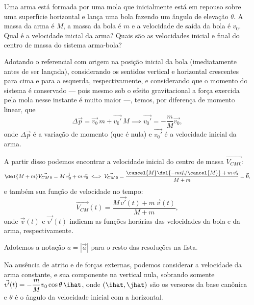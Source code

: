 \documentclass[]{IMTexam}
\author{Isabella B.}
\date{}
\begin{document}
\maketitle

\begin{questions}

	\question Uma arma está formada por uma mola que inicialmente está em repouso sobre uma superfície horizontal e lança uma bola fazendo um ângulo de elevação $ \theta $. A massa da arma é $ M $, a massa da bola é $ m $ e a velocidade de saída da bola é $ v_0 $. Qual é a velocidade inicial da arma? Quais são as velocidades inicial e final do centro de massa do sistema arma-bola?

	\begin{solution}
		Adotando o referencial com origem na posição inicial da bola (imediatamente antes de ser lançada), considerando os sentidos vertical e horizontal crescentes para cima e para a esquerda, respectivamente, e considerando que o momento do sistema é conservado --- pois mesmo sob o efeito gravitacional a força exercida pela mola nesse instante é muito maior ---, temos, por diferença de momento linear, que
		\[ \Delta \vec{p} = \vec{v_0}\,m + \vec{v_0'}\,M\implies \vec{v_0'}=-\dfrac{m}{M}\vec{v_0}, \]
		onde $ \Delta\vec{p} $ é a variação de momento (que é nula) e $ \vec{v_0'} $ é a velocidade inicial da arma.
		
		A partir disso podemos encontrar a velocidade inicial do centro de massa $ \vec{V_{CM\,0}} $:
		\[ \del{M+m}\vec{V_{CM\,0}}=M\,\vec{v_0'}+m\,\vec{v_0}\iff \vec{V_{CM\,0}}=\dfrac{\cancel{M}\del{-m\vec{v_0}/\cancel{M}}+m\,\vec{v_0}}{M+m}=\vec{0}, \]
		e também sua função de velocidade no tempo:
		\[ \vec{V_{CM}}(t)=\dfrac{M\,\vec{v'}(t)+m\,\vec{v}(t)}{M+m}, \]
		onde $ \vec{v}(t) $ e $ \vec{v'}(t) $ indicam as funções horárias das velocidades da bola e da arma, respectivamente.
		
		Adotemos a notação $ a=|\vec{a}| $ para o resto das resoluções na lista.
		
		Na ausência de atrito e de forças externas, podemos considerar a velocidade da arma constante, e sua componente na vertical nula, sobrando somente $ \vec{v'}(t)=-\dfrac{m}{M}v_0\cos\theta\,\ihat $, onde $ (\ihat,\jhat) $ são os versores da base canônica e $ \theta $ é o ângulo da velocidade inicial com a horizontal.
		

\end{solution}
\end{questions}
\end{document}
